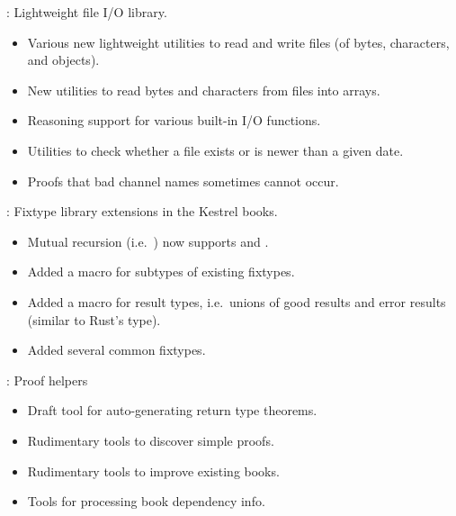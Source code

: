 
\begin{frame}

\implibtitle

:
Lightweight file I/O library.
\begin{itemize}
\item Various new lightweight utilities to read and write files
      (of bytes, characters, and objects).
\item New utilities to read bytes and characters from files into 
      arrays.
\item Reasoning support for various built-in I/O functions.
\item Utilities to check whether a file exists or is newer than a given date.
\item Proofs that bad channel names sometimes cannot occur.
\end{itemize}

\end{frame}


\begin{frame}

\implibtitle

:
Fixtype library extensions in the Kestrel books.
\begin{itemize}
\item Mutual recursion (i.e.\ )
      now supports  and .
\item Added a macro  for subtypes of existing fixtypes.
\item Added a macro  for result types,
      i.e.\ unions of good results and error results
      (similar to Rust's  type).
\item Added several common fixtypes.
\end{itemize}

\end{frame}


\begin{frame}

\implibtitle

:
Proof helpers
\begin{itemize}
\item Draft tool for auto-generating return type theorems.
\item Rudimentary tools to discover simple proofs.
\item Rudimentary tools to improve existing books.
\item Tools for processing book dependency info.
\end{itemize}

\end{frame}

